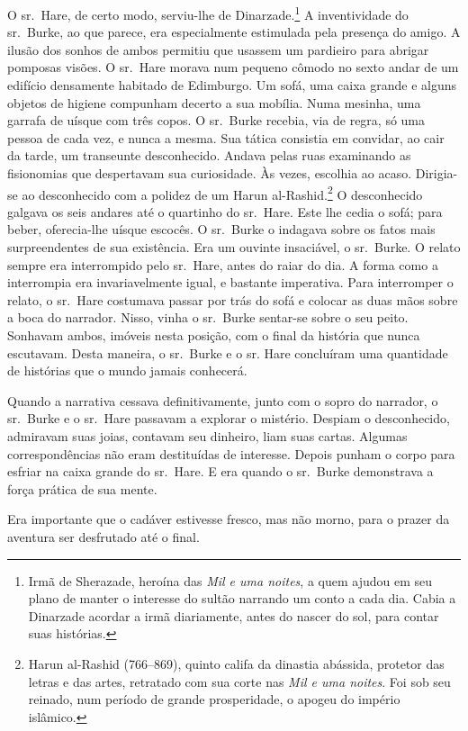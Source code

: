 O sr.~Hare, de certo modo, serviu-lhe de Dinarzade.\footnote{ Irmã de
Sherazade, heroína das \textit{Mil e uma noites}, a quem ajudou em seu
plano de manter o interesse do sultão narrando um conto a cada dia. Cabia
a Dinarzade acordar a irmã diariamente, antes do nascer do sol, para
contar suas histórias.} A inventividade do sr.~Burke, ao que
parece, era especialmente estimulada pela presença do amigo. A ilusão dos
sonhos de ambos permitiu que usassem um pardieiro para abrigar pomposas
visões. O sr.~Hare morava num pequeno cômodo no sexto andar de um edifício
densamente habitado de Edimburgo. Um sofá, uma caixa grande e alguns
objetos de higiene compunham decerto a sua mobília. Numa mesinha, uma
garrafa de uísque com três copos. O sr.~Burke recebia, via de regra, só
uma pessoa de cada vez, e nunca a mesma. Sua tática consistia em convidar,
ao cair da tarde, um transeunte desconhecido. Andava pelas ruas examinando
as fisionomias que despertavam sua curiosidade. Às vezes, escolhia ao
acaso. Dirigia-se ao desconhecido com a polidez de um
Harun al-Rashid.\footnote{ Harun al-Rashid (766--869), quinto califa da
dinastia abássida, protetor das letras e das artes, retratado com sua
corte nas \textit{Mil e uma noites}. Foi sob seu reinado, num período de
grande prosperidade, o apogeu do império islâmico.} O
desconhecido galgava os seis andares até o quartinho do sr.~Hare. Este lhe
cedia o sofá; para beber, oferecia-lhe uísque escocês. O sr.~Burke o
indagava sobre os fatos mais surpreendentes de sua existência. Era um
ouvinte insaciável, o sr.~Burke. O relato sempre era interrompido pelo sr.~Hare, 
antes do raiar do dia. A forma como a interrompia era
invariavelmente igual, e bastante imperativa. Para interromper o relato,
o sr.~Hare costumava passar por trás do sofá
e colocar as duas mãos sobre a boca do narrador. Nisso, vinha o sr.~Burke
sentar-se sobre o seu peito. Sonhavam ambos, imóveis nesta posição, com o
final da história que nunca escutavam. Desta maneira, o sr.~Burke e o sr.
Hare concluíram uma quantidade de histórias que o mundo jamais conhecerá.

Quando a narrativa cessava definitivamente, junto com o sopro do narrador,
o sr.~Burke e o sr.~Hare passavam a explorar o mistério. Despiam o
desconhecido, admiravam suas joias, contavam seu dinheiro, liam suas
cartas. Algumas correspondências não eram destituídas de interesse. Depois
punham o corpo para esfriar na caixa grande do sr.~Hare. E era quando o
sr.~Burke demonstrava a força prática de sua mente.

Era importante que o cadáver estivesse fresco, mas não morno, para o prazer
da aventura ser desfrutado até o final.

